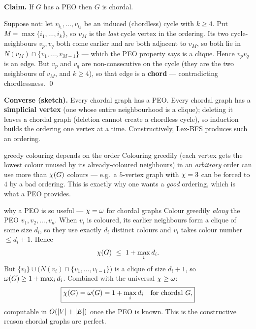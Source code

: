 \begin{correct}
\textbf{Claim.} If $G$ has a PEO then $G$ is chordal.

\prf Suppose not: let $v_{i_1},\dots,v_{i_k}$ be an induced (chordless) cycle with $k\ge4$. Put
$M=\max\{i_1,\dots,i_k\}$, so $v_M$ is the \emph{last} cycle vertex in the ordering. Its two
cycle-neighbours $v_p,v_q$ both come earlier and are both adjacent to $v_M$, so both lie in
$N(v_M)\cap\{v_1,\dots,v_{M-1}\}$ --- which the PEO property says is a clique. Hence $v_p v_q$ is
an edge. But $v_p$ and $v_q$ are non-consecutive on the cycle (they are the two neighbours of
$v_M$, and $k\ge4$), so that edge is a \textbf{chord} --- contradicting chordlessness. \qed

\smallskip
\textbf{Converse (sketch).} Every chordal graph has a PEO. Every chordal graph has a
\textbf{simplicial vertex} (one whose entire neighbourhood is a clique); deleting it leaves a
chordal graph (deletion cannot create a chordless cycle), so induction builds the ordering one
vertex at a time. Constructively, Lex-BFS produces such an ordering.
\end{correct}

\begin{trap}{greedy colouring depends on the order}
Colouring greedily (each vertex gets the lowest colour unused by its already-coloured neighbours)
in an \emph{arbitrary} order can use more than $\chi(G)$ colours --- e.g.\ a $5$-vertex graph
with $\chi=3$ can be forced to $4$ by a bad ordering. This is exactly why one wants a
\emph{good} ordering, which is what a PEO provides.
\end{trap}

\begin{facts}{why a PEO is so useful --- $\chi=\omega$ for chordal graphs}
Colour greedily \emph{along} the PEO $v_1,v_2,\dots,v_n$. When $v_i$ is coloured, its earlier
neighbours form a clique of some size $d_i$, so they use exactly $d_i$ distinct colours and
$v_i$ takes colour number $\le d_i+1$. Hence
\[
  \chi(G)\ \le\ 1+\max_i d_i .
\]
But $\{v_i\}\cup\bigl(N(v_i)\cap\{v_1,\dots,v_{i-1}\}\bigr)$ is a clique of size $d_i+1$, so
$\omega(G)\ge1+\max_i d_i$. Combined with the universal $\chi\ge\omega$:
\[
  \boxed{\chi(G)=\omega(G)=1+\max_i d_i\quad\text{for chordal }G,}
\]
computable in $O(|V|+|E|)$ once the PEO is known. This is the constructive reason chordal
graphs are perfect.
\end{facts}

